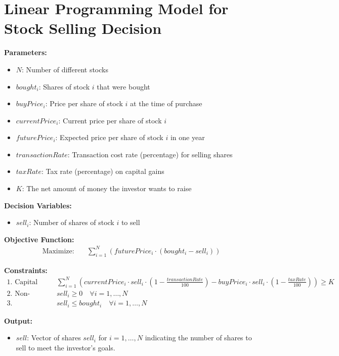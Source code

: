 \documentclass{article}
\begin{document}
\section*{Linear Programming Model for Stock Selling Decision}

\textbf{Parameters:}
\begin{itemize}
    \item $N$: Number of different stocks
    \item $bought_i$: Shares of stock $i$ that were bought
    \item $buyPrice_i$: Price per share of stock $i$ at the time of purchase
    \item $currentPrice_i$: Current price per share of stock $i$
    \item $futurePrice_i$: Expected price per share of stock $i$ in one year
    \item $transactionRate$: Transaction cost rate (percentage) for selling shares
    \item $taxRate$: Tax rate (percentage) on capital gains
    \item $K$: The net amount of money the investor wants to raise
\end{itemize}

\textbf{Decision Variables:}
\begin{itemize}
    \item $sell_i$: Number of shares of stock $i$ to sell
\end{itemize}

\textbf{Objective Function:}
\begin{align*}
\text{Maximize:} & \quad \sum_{i=1}^{N} \left( futurePrice_i \cdot (bought_i - sell_i) \right) 
\end{align*}

\textbf{Constraints:}
\begin{align*}
\text{1. Capital Gains and Transaction Costs:} & \quad \sum_{i=1}^{N} \left( currentPrice_i \cdot sell_i \cdot (1 - \frac{transactionRate}{100}) - buyPrice_i \cdot sell_i \cdot (1 - \frac{taxRate}{100}) \right) \geq K \\
\text{2. Non-Negativity:} & \quad sell_i \geq 0 \quad \forall i = 1, \ldots, N \\
\text{3. Maximum Shares Constraint:} & \quad sell_i \leq bought_i \quad \forall i = 1, \ldots, N
\end{align*}

\textbf{Output:}
\begin{itemize}
    \item $sell$: Vector of shares $sell_i$ for $i = 1, \ldots, N$ indicating the number of shares to sell to meet the investor's goals.
\end{itemize}
\end{document}

